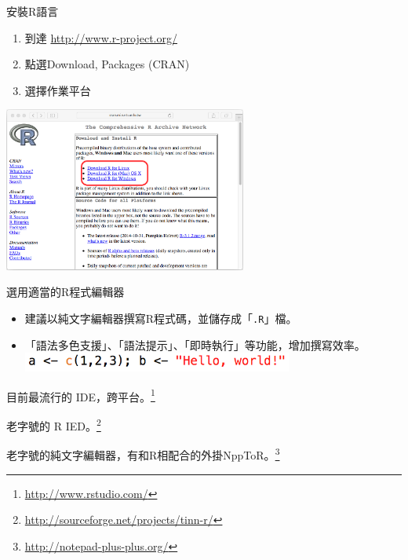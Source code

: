\documentclass[14pt, aspectratio=43]{beamer}
\let\oldfootnote\footnote
\renewcommand\footnote[1]{\hspace{-0.7em}\oldfootnote{\ignorespaces#1}\hspace{0.5em}}
\begin{document}
\begin{frame}[fragile]{安裝R語言}
\begin{enumerate}
\item 到達 \url{http://www.r-project.org/}
\item 點選Download, Packages (CRAN) \\
\item 選擇作業平台
\end{enumerate}
  \begin{center}\includegraphics[width=0.6\textwidth]{downloadR.png}\end{center}
\end{frame}

\begin{frame}[fragile]{選用適當的R程式編輯器}


\begin{itemize}
\item 建議以純文字編輯器撰寫R程式碼，並儲存成「\verb+.R+」檔。\\
\item 「語法多色支援」、「語法提示」、「即時執行」等功能，增加撰寫效率。\\ \includegraphics[width=0.7\textwidth]{editor.png}
\end{itemize}
\begin{description}
	\item [RStudio] 目前最流行的 IDE，跨平台。\footnote{\url{http://www.rstudio.com/}}
	\item [Tinn-R] 老字號的 R IED。\footnote{\url{http://sourceforge.net/projects/tinn-r/}}
	\item [Notepad++] 老字號的純文字編輯器，有和R相配合的外掛NppToR。\footnote{\url{http://notepad-plus-plus.org/}}
\end{description}
\end{frame}
\end{document}
